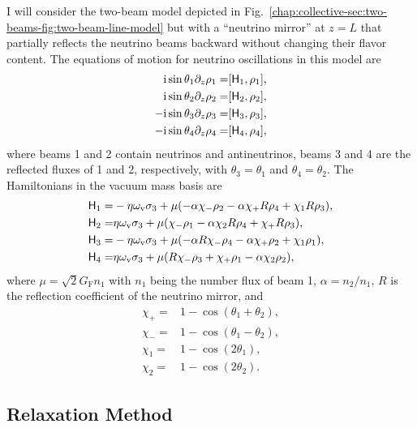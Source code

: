 I will consider the two-beam model depicted in Fig.~\ref{chap:collective-sec:two-beams-fig:two-beam-line-model} but with a ``neutrino mirror'' at $z=L$ that partially reflects the neutrino beams backward without changing their flavor content. The equations of motion for neutrino oscillations in this model are
\begin{align}
    \mathrm{i} \sin\theta_1 \partial_z \rho_1 = & [ \mathsf H_1, \rho_1 ], \\
    \mathrm{i} \sin\theta_2 \partial_z \rho_2 = & [ \mathsf H_2, \rho_2 ], \\
    -\mathrm{i} \sin\theta_3  \partial_z \rho_3 = & [ \mathsf H_3, \rho_3 ], \\
    -\mathrm{i} \sin\theta_4 \partial_z \rho_4 = & [ \mathsf H_4, \rho_4 ],
\end{align}
where beams 1 and 2 contain neutrinos and antineutrinos, beams 3 and 4 are the reflected fluxes of 1 and 2, respectively, with $\theta_3=\theta_1$ and $\theta_4=\theta_2$. The Hamiltonians in the vacuum mass basis are 
\begin{align}
    \mathsf H_1 =& -\eta \omega_\mathrm v \sigma_3 + \mu( -\alpha \chi_-  \rho_2 - \alpha \chi_+ R \rho_4 + \chi_1 R  \rho_3), \\
    \mathsf H_2 =& \eta \omega_\mathrm v \sigma_3 + \mu( \chi_- \rho_1 -\alpha \chi_2 R  \rho_4 + \chi_+ R  \rho_3), \\
    \mathsf H_3 =& -\eta \omega_\mathrm v \sigma_3 + \mu( -\alpha R  \chi_-  \rho_4 -\alpha \chi_+ \rho_2 + \chi_1  \rho_1), \\
    \mathsf H_4 =& \eta \omega_\mathrm v \sigma_3 + \mu( R   \chi_- \rho_3 + \chi_+  \rho_1 -\alpha \chi_2  \rho_2),
\end{align}
where $\mu=\sqrt{2}G_{\mathrm F}n_1$ with $n_1$ being the number flux of beam 1, $\alpha=n_2/n_1$, $R$ is the reflection coefficient of the neutrino mirror, and 
\begin{align*}
    \chi_+ = & 1 - \cos ( \theta_1 + \theta_2 ), \\
    \chi_- = & 1 - \cos ( \theta_1 - \theta_2 ), \\
    \chi_1 = & 1 - \cos ( 2\theta_1 ), \\
    \chi_2 = & 1 - \cos ( 2\theta_2 ).
\end{align*}




\subsection{\label{chap:halo-sec:num}Relaxation Method}



